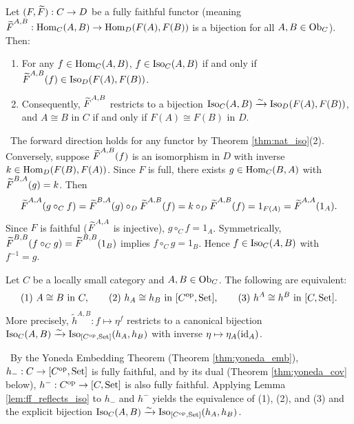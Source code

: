 \documentclass[10pt,a4paper]{article}
\begin{document}
\begin{lemma}\label{lem:ff_reflects_iso}
Let $(F, {\widetilde{F}\textrm{}}) : C \to D$ be a fully faithful functor (meaning ${\widetilde{F}\textrm{}}^{A,B} : {\textrm{Hom}}_C(A,B) \to {\textrm{Hom}}_D(F(A), F(B))$ is a bijection for all $A, B \in {\textrm{Ob}}_C$). Then:
\begin{enumerate}
\item For any $f \in {\textrm{Hom}}_C(A,B)$, $f \in {\mathrm{Iso}}_C(A,B)$ if and only if ${\widetilde{F}\textrm{}}^{A,B}(f) \in {\mathrm{Iso}}_D(F(A), F(B))$.
\item Consequently, ${\widetilde{F}\textrm{}}^{A,B}$ restricts to a bijection ${\mathrm{Iso}}_C(A,B) \xrightarrow{\sim} {\mathrm{Iso}}_D(F(A), F(B))$, and $A \cong B$ in $C$ if and only if $F(A) \cong F(B)$ in $D$.
\end{enumerate}
\end{lemma}
\myprf\ The forward direction holds for any functor by Theorem \ref{thm:nat_iso}(2). Conversely, suppose ${\widetilde{F}\textrm{}}^{A,B}(f)$ is an isomorphism in $D$ with inverse $k \in {\textrm{Hom}}_D(F(B), F(A))$. Since $F$ is full, there exists $g \in {\textrm{Hom}}_C(B,A)$ with ${\widetilde{F}\textrm{}}^{B,A}(g) = k$. Then
$${\widetilde{F}\textrm{}}^{A,A}(g \circ_C f) = {\widetilde{F}\textrm{}}^{B,A}(g) \circ_D {\widetilde{F}\textrm{}}^{A,B}(f) = k \circ_D {\widetilde{F}\textrm{}}^{A,B}(f) = 1_{F(A)} = {\widetilde{F}\textrm{}}^{A,A}(1_A).$$
Since $F$ is faithful (${\widetilde{F}\textrm{}}^{A,A}$ is injective), $g \circ_C f = 1_A$. Symmetrically, ${\widetilde{F}\textrm{}}^{B,B}(f \circ_C g) = {\widetilde{F}\textrm{}}^{B,B}(1_B)$ implies $f \circ_C g = 1_B$. Hence $f \in {\mathrm{Iso}}_C(A,B)$ with $f^{-1} = g$. \myqed

\begin{theorem}\label{thm:yoneda_iso}
Let $C$ be a locally small category and $A, B \in {\textrm{Ob}}_C$. The following are equivalent:
$$\text{(1) } A \cong B \text{ in } C, \qquad \text{(2) } h_A \cong h_B \text{ in } [C^{\textrm{op}}, {\textrm{Set}}], \qquad \text{(3) } h^A \cong h^B \text{ in } [C, {\textrm{Set}}].$$
More precisely, $\widetilde{h}^{A,B} : f \mapsto \eta^f$ restricts to a canonical bijection ${\mathrm{Iso}}_C(A, B) \xrightarrow{\sim} {\mathrm{Iso}}_{[C^{\textrm{op}}, {\textrm{Set}}]}(h_A, h_B)$ with inverse $\eta \mapsto \eta_A({\textrm{id}}_A)$.
\end{theorem}
\myprf\ By the Yoneda Embedding Theorem (Theorem \ref{thm:yoneda_emb}), $h_- : C \to [C^{\textrm{op}}, {\textrm{Set}}]$ is fully faithful, and by its dual (Theorem \ref{thm:yoneda_cov} below), $h^- : C^{\textrm{op}} \to [C, {\textrm{Set}}]$ is also fully faithful. Applying Lemma \ref{lem:ff_reflects_iso} to $h_-$ and $h^-$ yields the equivalence of (1), (2), and (3) and the explicit bijection ${\mathrm{Iso}}_C(A, B) \xrightarrow{\sim} {\mathrm{Iso}}_{[C^{\textrm{op}}, {\textrm{Set}}]}(h_A, h_B)$. \myqed
\end{document}
